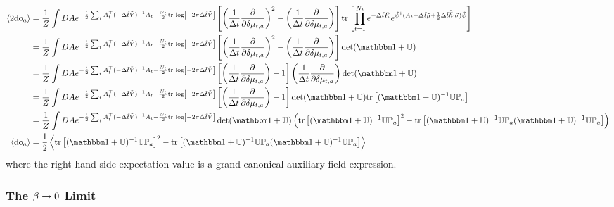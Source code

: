 \begin{align}
    \expectation{2\doubleOccupancy_a}
    &=
    \oneover{Z}\int DA e^{-\frac{1}{2} \sum_t A\transpose_t (-\Delta\tilde{t} \tilde{V})\inverse A_t - \frac{N_t}{2} \trlog{ -2\pi \Delta\tilde{t}\tilde{V}}}
    \left[\left(\oneover{\Delta t}\frac{\partial}{\partial \delta\mu_{t,a}}\right)^2 - \left(\oneover{\Delta t}\frac{\partial}{\partial \delta\mu_{t,a}}\right)\right]\tr{\prod_{t=1}^{N_t} e^{-\Delta \tilde{t}\tilde{K}}  e^{ \tilde{\psi}\adjoint (A_t + \Delta\tilde{t} \tilde{\mu} + \half \Delta\tilde{t} \tilde{\vec{h}}\cdot\vec{\sigma})\tilde{\psi}}}
    \nonumber\\
    &=
    \oneover{Z}\int DA e^{-\frac{1}{2} \sum_t A\transpose_t (-\Delta\tilde{t} \tilde{V})\inverse A_t - \frac{N_t}{2} \trlog{ -2\pi \Delta\tilde{t}\tilde{V}}}
    \left[\left(\oneover{\Delta t}\frac{\partial}{\partial \delta\mu_{t,a}}\right)^2 - \left(\oneover{\Delta t}\frac{\partial}{\partial \delta\mu_{t,a}}\right)\right] \det(\one + \UU)
    \nonumber\\
    &=
    \oneover{Z}\int DA e^{-\frac{1}{2} \sum_t A\transpose_t (-\Delta\tilde{t} \tilde{V})\inverse A_t - \frac{N_t}{2} \trlog{ -2\pi \Delta\tilde{t}\tilde{V}}}
    \left[\left(\oneover{\Delta t}\frac{\partial}{\partial \delta\mu_{t,a}}\right) - 1 \right] \left(\oneover{\Delta t}\frac{\partial}{\partial \delta\mu_{t,a}}\right) \det(\one + \UU)
    \nonumber\\
    &=
    \oneover{Z}\int DA e^{-\frac{1}{2} \sum_t A\transpose_t (-\Delta\tilde{t} \tilde{V})\inverse A_t - \frac{N_t}{2} \trlog{ -2\pi \Delta\tilde{t}\tilde{V}}}
    \left[\left(\oneover{\Delta t}\frac{\partial}{\partial \delta\mu_{t,a}}\right) - 1 \right] \det(\one + \UU) \tr{(\one + \UU)\inverse \UU \PP_a}
    \nonumber\\
    &=
    \oneover{Z}\int DA e^{-\frac{1}{2} \sum_t A\transpose_t (-\Delta\tilde{t} \tilde{V})\inverse A_t - \frac{N_t}{2} \trlog{ -2\pi \Delta\tilde{t}\tilde{V}}}
    \det( \one+\UU ) \left(\tr{(\one + \UU)\inverse \UU \PP_a}^2 - \tr{(\one+\UU)\inverse \UU \PP_a (\one+\UU)\inverse \UU \PP_a}\right)
    \nonumber\\
    \expectation{\doubleOccupancy_a}
    &=
    \half\expectation{\tr{(\one + \UU)\inverse \UU \PP_a}^2 - \tr{(\one+\UU)\inverse \UU \PP_a (\one+\UU)\inverse \UU \PP_a}}
    \label{eq:double occupancy}
\end{align}
where the right-hand side expectation value is a grand-canonical auxiliary-field expression.

\subsubsection{The $\beta\rightarrow0$ Limit}

